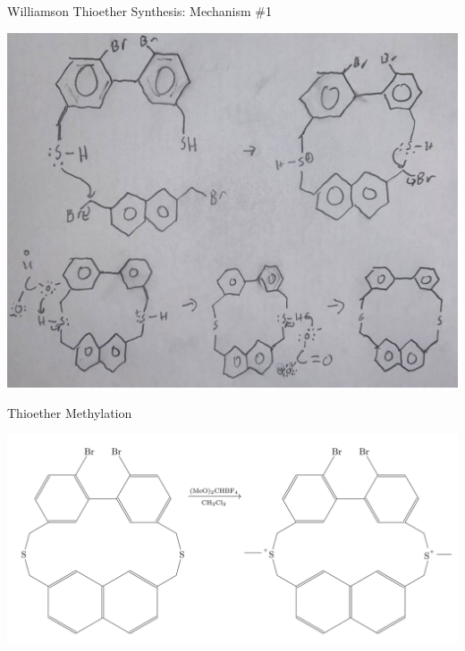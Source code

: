 \documentclass[notes]{beamer}
\begin{document}
\begin{frame}{Williamson Thioether Synthesis: Mechanism \#1}
\begin{center}
    \includegraphics[scale=.35]{williamson_thioether_synthesis_one.JPG}
\end{center}
\end{frame}


\begin{frame}{Thioether Methylation}
\begin{center}
    \includegraphics[scale=.4]{thioether_methylation_overall.PNG}
\end{center}
\end{frame}
\end{document}
